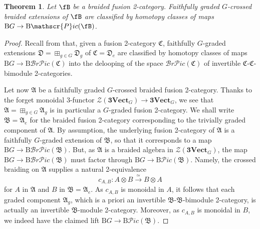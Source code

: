 \documentclass[11pt,reqno]{amsart}
\newcommand{\sPic}{\mathscr{P}ic}
\newcommand{\sBrPic}{\mathscr{B}r\mathscr{P}ic}
\newcommand{\cZ}{\mathcal{Z}}
\newcommand{\rB}{\mathrm{B}}
\numberwithin{equation}{section}
\theoremstyle{plain}
\newtheorem{thm}[equation]{Theorem}
\theoremstyle{definition}
\begin{document}
\begin{thm}\label{thm:crossedextn}
Let $\fB$ be a braided fusion 2-category. Faithfully graded $G$-crossed braided extensions of $\fB$ are classified by homotopy classes of maps $\rB G \rightarrow \rB \sPic(\fB)$.
\end{thm}
\begin{proof}
Recall from \cite[Theorem 3.11]{D11} that, given a fusion 2-category $\mathfrak{C}$, faithfully $G$-graded extensions $\mathfrak{D}=\boxplus_{g\in G}\mathfrak{D}_g$ of $\mathfrak{C}=\mathfrak{D}_e$ are classified by homotopy classes of maps $\rB G\rightarrow \rB \sBrPic(\mathfrak{C})$ into the delooping of the space $\sBrPic(\mathfrak{C})$ of invertible $\mathfrak{C}$-$\mathfrak{C}$-bimodule 2-categories.

Let now $\mathfrak{A}$ be a faithfully graded $G$-crossed braided fusion 2-category.
Thanks to the forget monoidal 3-functor $\mathcal{Z}(\mathbf{3Vect}_G)\rightarrow\mathbf{3Vect}_G$, we see that $\mathfrak{A}=\boxplus_{g\in G}\mathfrak{A}_g$ is in particular a $G$-graded fusion 2-category.
We shall write $\mathfrak{B} = \mathfrak{A}_e$ for the braided fusion 2-category corresponding to the trivially graded component of $\mathfrak{A}$.
By assumption, the underlying fusion 2-category of $\mathfrak{A}$ is a faithfully $G$-graded extension of $\mathfrak{B}$, so that it corresponds to a map $\rB G\rightarrow \rB \sBrPic(\mathfrak{B})$.
But, as $\mathfrak{A}$ is a braided algebra in $\cZ(\mathbf{3Vect}_G)$, the map $\rB G\rightarrow \rB \sBrPic(\mathfrak{B})$ must factor through $\rB G\rightarrow \rB \sPic(\mathfrak{B})$.
Namely, the crossed braiding on $\mathfrak{A}$ supplies a natural 2-equivalence
$$c_{A,B}:A\otimes B \xrightarrow{\simeq} B\otimes A$$
for $A$ in $\mathfrak{A}$ and $B$ in $\mathfrak{B}=\mathfrak{A}_e$.
As $c_{A,B}$ is monoidal in $A$, it follows that each graded component $\mathfrak{A}_g$, which is a priori an invertible $\mathfrak{B}$-$\mathfrak{B}$-bimodule 2-category, is actually an invertible $\mathfrak{B}$-module 2-category. Moreover, as $c_{A,B}$ is monoidal in $B$, we indeed have the claimed lift $\rB G\rightarrow \rB \sPic(\mathfrak{B})$.


\end{proof}
\end{document}
